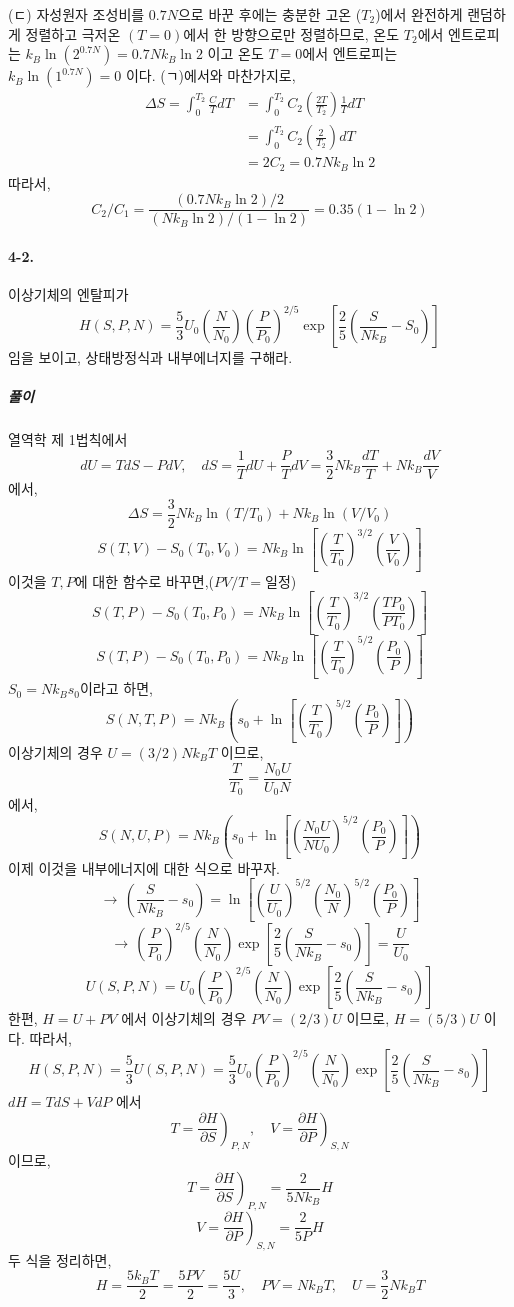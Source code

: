 \documentclass[a4paper,12pt]{report}
\begin{document}
	(ㄷ) 자성원자 조성비를 $0.7N$으로  바꾼 후에는 충분한 고온 ($T_2$)에서 완전하게 랜덤하게 정렬하고 극저온 $(T=0)$에서 한 방향으로만 정렬하므로, 온도 $T_2$에서 엔트로피는 $k_B\ln (2^{0.7N})=0.7Nk_B\ln2$ 이고 온도 $T=0$에서 엔트로피는 $k_B\ln(1^{0.7N})=0$ 이다. (ㄱ)에서와 마찬가지로, 
	\begin{equation}
	\begin{split}
	\Delta S=\int_{0}^{T_2} \frac{C}{T}dT &=\int_{0}^{T_2}C_2\left(\frac{2T}{T_2} \right)\frac{1}{T}dT \\
	& = \int_{0}^{T_2}C_2\left(\frac{2}{T_2} \right)dT\\
	& = 2C_2=0.7Nk_B\ln 2
	\end{split}
	\end{equation}
	따라서, 
	$$C_2/C_1=\frac{(0.7Nk_B\ln 2) / 2}{(Nk_B\ln 2)/(1-\ln 2)}=0.35(1-\ln2)$$
	\paragraph{4-2. } 이상기체의 엔탈피가 
	$$H(S,P,N)=\frac{5}{3}U_0\left(\frac{N}{N_0} \right)\left(\frac{P}{P_0} \right)^{2/5}\exp\left[\frac{2}{5}\left(\frac{S}{Nk_B}-S_0 \right) \right]  $$
	임을 보이고, 상태방정식과 내부에너지를 구해라.
	\subparagraph{풀이} 열역학 제 1법칙에서 
	$$dU=TdS-PdV,\quad dS=\frac{1}{T}dU+\frac{P}{T}dV=\frac{3}{2}Nk_B\frac{dT}{T}+Nk_B\frac{dV}{V} $$에서,
	$$\Delta S=\frac{3}{2}Nk_B\ln(T/T_0)+Nk_B\ln(V/V_0)$$
	$$S(T,V)-S_0(T_0,V_0)=Nk_B\ln\left[\left(\frac{T}{T_0}\right)^{3/2}\left(\frac{V}{V_0}\right)\right]$$
	이것을 $T,P$에 대한 함수로 바꾸면,($PV/T=$일정)
	$$S(T,P)-S_0(T_0,P_0)=Nk_B\ln\left[\left(\frac{T}{T_0}\right)^{3/2}\left(\frac{TP_0}{PT_0}\right)\right]$$
	$$S(T,P)-S_0(T_0,P_0)=Nk_B\ln\left[\left(\frac{T}{T_0}\right)^{5/2}\left(\frac{P_0}{P}\right)\right]$$
	$S_0=Nk_Bs_0$이라고 하면,
	$$S(N,T,P)=Nk_B\left(s_0+\ln\left[\left(\frac{T}{T_0} \right)^{5/2} \left(\frac{P_0}{P} \right) \right] \right) $$
	이상기체의 경우 $U=(3/2)Nk_BT$ 이므로,
	$$\frac{T}{T_0}=\frac{N_0U}{U_0N}$$
	에서, 
	$$S(N,U,P)=Nk_B\left(s_0+\ln\left[\left(\frac{N_0U}{NU_0} \right)^{5/2} \left(\frac{P_0}{P} \right) \right] \right) $$
	이제 이것을 내부에너지에 대한 식으로 바꾸자.
	$$\rightarrow \, \left( \frac{S}{Nk_B}-s_0\right)=\ln\left[\left(\frac{U}{U_0} \right)^{5/2} \left(\frac{N_0}{N} \right)^{5/2} \left(\frac{P_0}{P} \right)  \right]  $$
	$$\rightarrow \, \left(\frac{P}{P_0} \right)^{2/5} \left(\frac{N}{N_0} \right) \exp\left[\frac{2}{5}\left( \frac{S}{Nk_B}-s_0\right)\right]=\frac{U}{U_0}  $$
	$$U(S,P,N)=U_0\left(\frac{P}{P_0} \right)^{2/5} \left(\frac{N}{N_0} \right) \exp\left[\frac{2}{5}\left( \frac{S}{Nk_B}-s_0\right)\right]$$
	한편, $H=U+PV$ 에서 이상기체의 경우 $PV=(2/3)U$ 이므로, $H=(5/3)U$ 이다. 따라서,
	$$H(S,P,N)=\frac{5}{3}U(S,P,N)=\frac{5}{3}U_0\left(\frac{P}{P_0} \right)^{2/5} \left(\frac{N}{N_0} \right) \exp\left[\frac{2}{5}\left( \frac{S}{Nk_B}-s_0\right)\right]$$
	$dH=TdS+VdP$ 에서 
	$$T=\left. \frac{\partial H}{\partial S}\right) _{P,N},\quad V=\left.\frac{\partial H}{\partial P} \right)_{S,N} $$ 이므로,
	$$T=\left. \frac{\partial H}{\partial S}\right) _{P,N}=\frac{2}{5Nk_B}H$$
	$$V=\left.\frac{\partial H}{\partial P} \right)_{S,N} =\frac{2}{5P}H$$
	두 식을 정리하면,
	$$H=\frac{5k_BT}{2}=\frac{5PV}{2}=\frac{5U}{3},\quad PV=Nk_BT,\quad U=\frac{3}{2}Nk_BT$$
\end{document}
